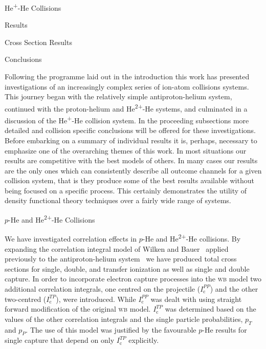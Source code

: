 \documentclass[letterpaper, 11 pt]{report}
\begin{document}
\begin{chapter}{\texorpdfstring{He\textsuperscript{+}}{He+}-He Collisions \label{chap:hephe}}
\begin{section}{Results \label{sec:hephe-disc}}
\begin{subsection}{Cross Section Results \label{sec:hephe-res}}
      \end{subsection}

   \end{section}

\end{chapter}

\begin{chapter}{Conclusions \label{chap:con}}

   Following the programme laid out in the introduction this work has presented investigations of an
   increasingly complex series of ion-atom collisions systems. This journey began with the relatively
   simple antiproton-helium system, continued with the proton-helium and He\textsuperscript{2+}-He
   systems, and culminated in a discussion of the He\textsuperscript{+}-He collision system. In the
   proceeding subsections more detailed and collision specific conclusions will be offered for these
   investigations. Before embarking on a summary of individual results it is, perhaps, necessary to
   emphasize one of the overarching themes of this work. In most situations our results are competitive
   with the best models of others. In many cases our results are the only ones which can consistently
   describe all outcome channels for a given collision system, that is they produce some of the best
   results available without being focused on a specific process. This certainly demonstrates the
   utility of density functional theory techniques over a fairly wide range of systems.

   \begin{section}{\texorpdfstring{$p$}{p}-He and \texorpdfstring{He\textsuperscript{2+}}{He2+}-He
                   Collisions \label{sec:con-phe2p-he}}

      We have investigated correlation effects in $p$-He and He\textsuperscript{2+}-He collisions. By
      expanding the correlation integral model of Wilken and Bauer~\cite{wb} applied previously to the
      antiproton-helium system~\cite{pbarhe} we have produced total cross sections for single, double,
      and transfer ionization as well as single and double capture. In order to incorporate electron
      capture processes into the \textsc{wb} model two additional correlation integrals, one centred on
      the projectile ($I^{PP}_\mathrm{c}$) and the other two-centred ($I^{TP}_\mathrm{c}$), were
      introduced. While $I^{PP}_\mathrm{c}$ was dealt with using straight forward modification of the
      original \textsc{wb} model. $I^{TP}_\mathrm{c}$ was determined based on the values of the other
      correlation integrals and the single particle probabilities, $p_T$ and $p_P$. The use of this
      model was justified by the favourable $p$-He results for single capture that depend on only
      $I^{TP}_\mathrm{c}$ explicitly.


\end{section}
\end{chapter}
\end{document}
